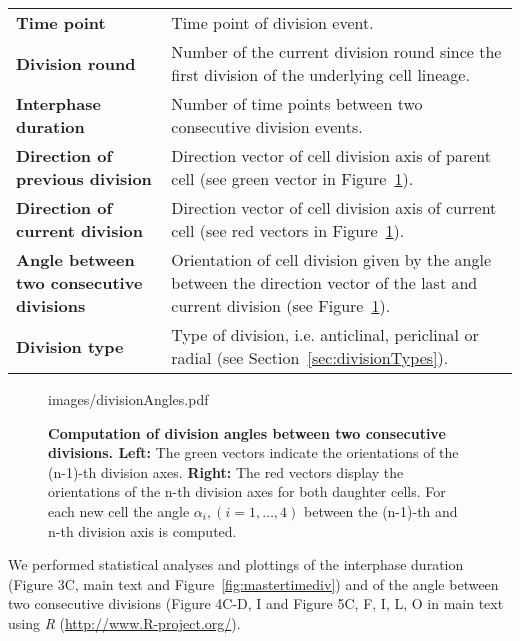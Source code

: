 \documentclass[11pt,a4paper, final]{article}
\begin{document}
\noindent
\begin{tabularx}{\textwidth}{@{} >{\RaggedRight}p{6.8cm} X @{}}
\textbf{Time point} &
Time point of division event.\\
\textbf{Division round} &
Number of the current division round since the first division of the underlying cell lineage.\\
\textbf{Interphase duration}&
Number of time points between two consecutive division events.\\
\textbf{Direction of previous division} &
Direction vector of cell division axis of parent cell  (see green vector in Figure~\ref{fig:divisionAngles}).\\
\textbf{Direction of current division} &
Direction vector of cell division axis of current cell  (see red vectors in Figure~\ref{fig:divisionAngles}).\\
\textbf{Angle between two consecutive divisions}&
Orientation of cell division given by the angle between the direction vector of the last and current division (see Figure~\ref{fig:divisionAngles}).\\
\textbf{Division type} &
Type of division, i.e. anticlinal, periclinal or radial (see Section~\ref{sec:divisionTypes}).\\
\end{tabularx}
%
\begin{figure}[htbp]
	\begin{center}
		\begin{overpic}[width=0.9\linewidth]{images/divisionAngles.pdf}
		\end{overpic}
\caption[]
{
{\bf Computation of division angles between two consecutive divisions. Left:} The green vectors indicate the orientations of the (n-1)-th division axes. \textbf{Right:} The red vectors display the orientations of the n-th division axes for both daughter cells. For each new cell the angle $\alpha_i, (i=1,\ldots,4)$ between the (n-1)-th and n-th division axis is computed.
}
	\label{fig:divisionAngles}
	\end{center}
\end{figure}
%

\noindent
We performed statistical analyses and plottings of the interphase duration (Figure 3C, main text and Figure~\ref{fig:mastertimediv}) and of the angle between two consecutive divisions (Figure 4C-D, I and Figure 5C, F, I, L, O in main text using \textit{R} (\href{http://www.R-project.org/}{http://www.R-project.org/}).

\clearpage
\end{document}
